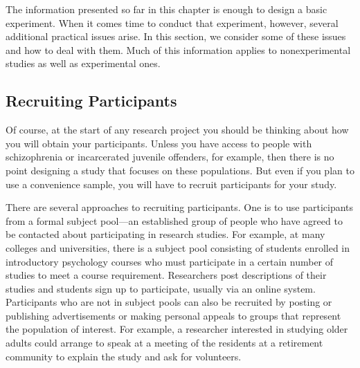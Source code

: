 The information presented so far in this chapter is enough to design a basic experiment. When it comes time to conduct that experiment, however, several additional practical issues arise. In this section, we consider some of these issues and how to deal with them. Much of this information applies to nonexperimental studies as well as experimental ones.

\subsection{Recruiting Participants}

Of course, at the start of any research project you should be thinking about how you will obtain your participants. Unless you have access to people with schizophrenia or incarcerated juvenile offenders, for example, then there is no point designing a study that focuses on these populations. But even if you plan to use a convenience sample, you will have to recruit participants for your study.

There are several approaches to recruiting participants. One is to use participants from a formal subject pool---an established group of people who have agreed to be contacted about participating in research studies. For example, at many colleges and universities, there is a subject pool consisting of students enrolled in introductory psychology courses who must participate in a certain number of studies to meet a course requirement. Researchers post descriptions of their studies and students sign up to participate, usually via an online system. Participants who are not in subject pools can also be recruited by posting or publishing advertisements or making personal appeals to groups that represent the population of interest. For example, a researcher interested in studying older adults could arrange to speak at a meeting of the residents at a retirement community to explain the study and ask for volunteers.

